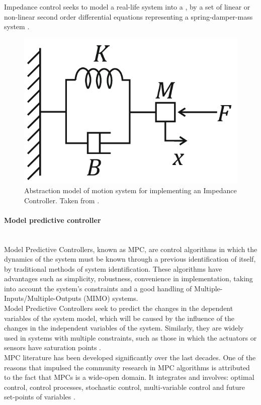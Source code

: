 \documentclass[11pt]{report} %
\newcommand{\subsubsubsection}[1]{\paragraph{#1}\mbox{}\\}
\begin{document}
Impedance control seeks to model a real-life system into a , by a set of linear or non-linear second order differential equations representing a spring-damper-mass system \citep{cite_canudas_theory_of_robotic_control}.\\

\begin{figure}[H]
    \centering
    \includegraphics[width=0.4\linewidth]{assets/imgs/reference_framework/mass_damper_mass_system_for_impedance_control.png}
    \caption{Abstraction model of motion system for implementing an Impedance Controller. Taken from \citep{cite_mass_spring_damper_system_ic}.} 
    \label{fig_vuz_stereo_camera_device}
\end{figure}


\subsubsubsection{Model predictive controller}

Model Predictive Controllers, known as MPC, are control algorithms in which the dynamics of the system must be known through a previous identification of itself, by traditional methods of system identification. These algorithms have advantages such as simplicity, robustness, convenience in implementation, taking into account the system's constraints and a good handling of Multiple-Inputs/Multiple-Outputs (MIMO) systems.\\

Model Predictive Controllers seek to predict the changes in the dependent variables of the system model, which will be caused by the influence of the changes in the independent variables of the system. Similarly, they are widely used in systems with multiple constraints, such as those in which the actuators or sensors have saturation points \citep{cite_mpc_industrial_processes_automation_systems}.\\

MPC literature has been developed significantly over the last decades. One of the reasons that impulsed the community research in MPC algorithms is attributed to the fact that MPCs is a wide-open domain. It integrates and involves: optimal control, control processes, stochastic control, multi-variable control and future set-points of variables \citep{cite_model_predictive_control_camacho_bordons}.\\ 
\end{document}
